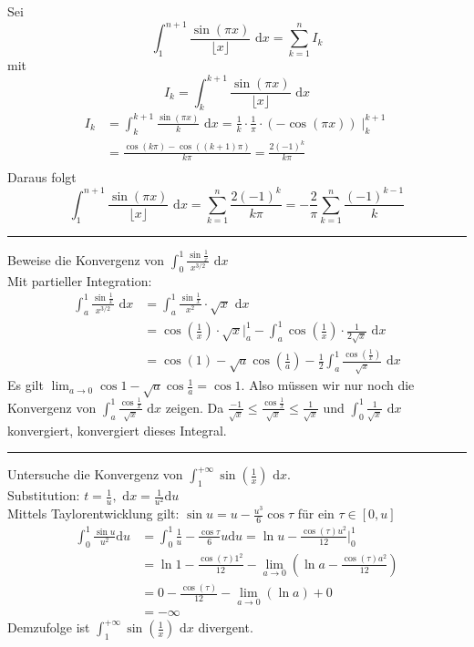 \documentclass[a4paper,fontsize = 7pt]{scrartcl}
\def\dx{\text{ d}x}
\begin{document}
Sei $$\int_1^{n+1} \frac{\sin(\pi x)}{\lfloor x\rfloor}\dx = \sum_{k=1}^{n} I_k$$ 
mit $$I_k = \int_k^{k+1}\frac{\sin(\pi x)}{\lfloor x\rfloor}\dx$$
\begin{align*}
  I_k &= \int_k^{k+1} \frac{\sin(\pi x)}{k}\dx = \frac{1}{k}\cdot\frac{1}{\pi}\cdot \left(-\cos(\pi x)\right)\mid_k^{k+1}\\
      &= \frac{\cos(k\pi) - \cos((k+1)\pi)}{k\pi} = \frac{2(-1)^k}{k\pi}\\ 
\end{align*}
Daraus folgt
$$\int_1^{n+1} \frac{\sin(\pi x)}{\lfloor x\rfloor}\dx = \sum_{k=1}^{n}\frac{2(-1)^k}{k\pi} = -\frac{2}{\pi}\sum_{k=1}^{n}\frac{(-1)^{k-1}}{k}$$

\vspace{0.1 cm}
\hrule
\vspace{0.2 cm}

Beweise die Konvergenz von $\int_{0}^1 \frac{\sin \frac{1}{x}}{x^{3/2}} \dx$
\\Mit partieller Integration:
\begin{align*}
  \int_a^1 \frac{\sin \frac{1}{x}}{x^{3/2}}\dx &= \int_a^1 \frac{\sin\frac{1}{x}}{x^2}\cdot \sqrt{x} \dx\\
                                               &= \cos\left(\frac{1}{x}\right)\cdot\sqrt{x}\bigg|_a^1 - \int_a^1 \cos\left(\frac{1}{x}\right) \cdot \frac{1}{2\sqrt{x}}\dx\\
                                               &= \cos(1) - \sqrt{a}\cos\left(\frac{1}{a}\right) - \frac{1}{2} \int_a^1 \frac{\cos\left(\frac{1}{x}\right)}{\sqrt{x}}\dx                                              
\end{align*}
Es gilt $\lim_{a \to 0} \cos1 - \sqrt{a}\cos\frac{1}{a} = \cos 1$.
Also müssen wir nur noch die Konvergenz von $\int_a^1\frac{\cos \frac{1}{x}}{\sqrt{x}}\dx$ zeigen.
Da $\frac{-1}{\sqrt{x}} \leq \frac{\cos \frac{1}{x}}{\sqrt{x}} \leq \frac{1}{\sqrt{x}}$ und $\int_0^1 \frac{1}{\sqrt{x}}\dx$ konvergiert, konvergiert dieses Integral.

\vspace{0.1 cm}
\hrule
\vspace{0.2 cm}

Untersuche die Konvergenz von $\int_1^{+\infty} \sin\left(\frac{1}{x}\right)\dx$.
\\Substitution: $t = \frac{1}{u}, \dx = \frac{1}{u^2} \text{d}u$
\\Mittels Taylorentwicklung gilt: $\sin u = u - \frac{u^3}{6}\cos \tau$ für ein $\tau \in [0, u]$
\begin{align*}
  \int_0^1 \frac{\sin u}{u^2}\text{d}u &= \int_0^1 \frac{1}{u} - \frac{\cos \tau}{6}u\text{d}u = \ln u -\frac{\cos(\tau) u^2}{12} \bigg|_0^1\\
                                       &= \ln 1 - \frac{\cos(\tau)1^2}{12} - \lim_{a \to 0}\left(\ln a - \frac{\cos(\tau)a^2}{12}\right)\\
                                       &= 0 - \frac{\cos(\tau)}{12} - \lim_{a \to 0}\left(\ln a\right) + 0\\
                                       &= -\infty
\end{align*}
Demzufolge ist $\int_1^{+\infty} \sin\left(\frac{1}{x}\right)\dx$ divergent.
\end{document}
